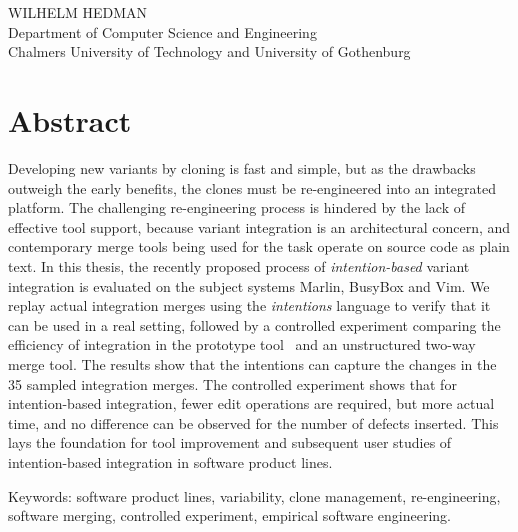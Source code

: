 \fullt\\
\subt\\
WILHELM HEDMAN\\
Department of Computer Science and Engineering\\
Chalmers University of Technology and University of Gothenburg\setlength{\parskip}{0.5cm}

\thispagestyle{plain}			%
\setlength{\parskip}{0pt plus 1.0pt}
\section*{Abstract}
Developing new variants by cloning is fast and simple, but as the drawbacks outweigh the early benefits, the clones must be re-engineered into an integrated platform. The challenging re-engineering process is hindered by the lack of effective tool support, because variant integration is an architectural concern, and contemporary merge tools being used for the task operate on source code as plain text. In this thesis, the recently proposed process of \textit{intention-based} variant integration is evaluated on the subject systems Marlin, BusyBox and Vim. We replay actual integration merges using the \textit{intentions} language to verify that it can be used in a real setting, followed by a controlled experiment comparing the efficiency of integration in the prototype tool \tooln~and an unstructured two-way merge tool. The results show that the intentions can capture the changes in the 35 sampled integration merges. The controlled experiment shows that for intention-based integration, fewer edit operations are required, but more actual time, and no difference can be observed for the number of defects inserted. This lays the foundation for tool improvement and subsequent user studies of intention-based integration in software product lines.


\vfill
Keywords: software product lines, variability, clone management, re-engineering, software merging, controlled experiment, empirical software engineering.

\newpage				%
\thispagestyle{empty}
\mbox{}